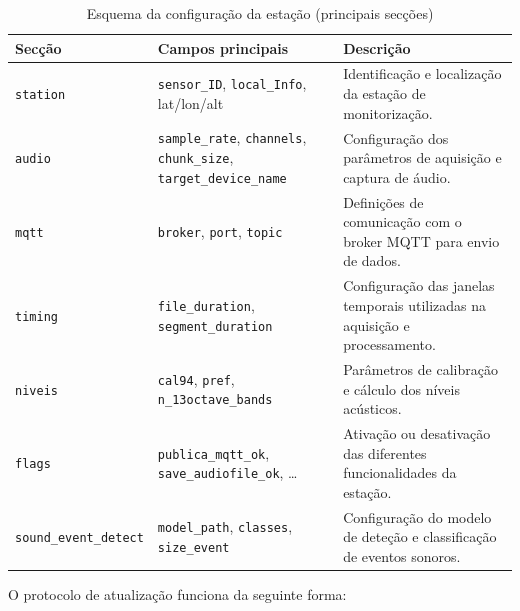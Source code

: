 \documentclass[12pt,a4paper]{report}
\begin{document}
\begin{table}[H]
\centering
\small
\renewcommand{\arraystretch}{1.4} %
\caption{Esquema da configuração da estação (principais secções)}
\label{tab:config_schema}

\begin{tabularx}{\linewidth}{|l|X|>{\raggedright\arraybackslash}X|}
\hline
\textbf{Secção} & \textbf{Campos principais} & \textbf{Descrição} \\
\hline
\texttt{station}
& \texttt{sensor\_ID}, \texttt{local\_Info}, lat/lon/alt
& Identificação e localização da estação de monitorização. \\
\hline

\texttt{audio}
& \texttt{sample\_rate}, \texttt{channels}, \texttt{chunk\_size}, \texttt{target\_device\_name}
& Configuração dos parâmetros de aquisição e captura de áudio. \\
\hline

\texttt{mqtt}
& \texttt{broker}, \texttt{port}, \texttt{topic}
& Definições de comunicação com o broker MQTT para envio de dados. \\
\hline

\texttt{timing}
& \texttt{file\_duration}, \texttt{segment\_duration}
& Configuração das janelas temporais utilizadas na aquisição e processamento. \\
\hline

\texttt{niveis}
& \texttt{cal94}, \texttt{pref}, \texttt{n\_13octave\_bands}
& Parâmetros de calibração e cálculo dos níveis acústicos. \\
\hline

\texttt{flags}
& \texttt{publica\_mqtt\_ok}, \texttt{save\_audiofile\_ok}, \ldots
& Ativação ou desativação das diferentes funcionalidades da estação. \\
\hline

\texttt{sound\_event\_detect}
& \texttt{model\_path}, \texttt{classes}, \texttt{size\_event}
& Configuração do modelo de deteção e classificação de eventos sonoros. \\
\hline

\end{tabularx}
\end{table}

O protocolo de atualização funciona da seguinte forma:
\end{document}

